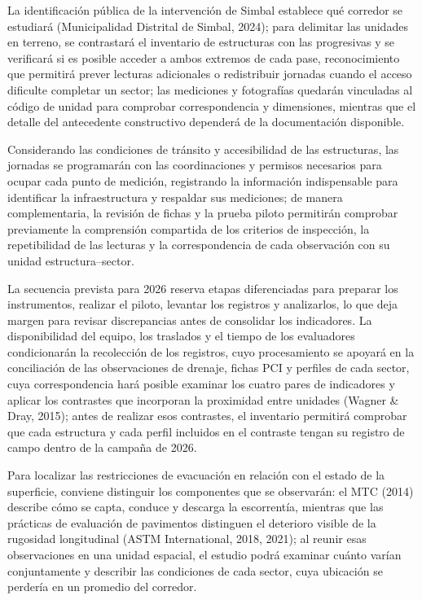 La identificación pública de la intervención de Simbal establece qué corredor se estudiará (Municipalidad Distrital de Simbal, 2024); para delimitar las unidades en terreno, se contrastará el inventario de estructuras con las progresivas y se verificará si es posible acceder a ambos extremos de cada pase, reconocimiento que permitirá prever lecturas adicionales o redistribuir jornadas cuando el acceso dificulte completar un sector; las mediciones y fotografías quedarán vinculadas al código de unidad para comprobar correspondencia y dimensiones, mientras que el detalle del antecedente constructivo dependerá de la documentación disponible.

Considerando las condiciones de tránsito y accesibilidad de las estructuras, las jornadas se programarán con las coordinaciones y permisos necesarios para ocupar cada punto de medición, registrando la información indispensable para identificar la infraestructura y respaldar sus mediciones; de manera complementaria, la revisión de fichas y la prueba piloto permitirán comprobar previamente la comprensión compartida de los criterios de inspección, la repetibilidad de las lecturas y la correspondencia de cada observación con su unidad estructura–sector.

La secuencia prevista para 2026 reserva etapas diferenciadas para preparar los instrumentos, realizar el piloto, levantar los registros y analizarlos, lo que deja margen para revisar discrepancias antes de consolidar los indicadores. La disponibilidad del equipo, los traslados y el tiempo de los evaluadores condicionarán la recolección de los registros, cuyo procesamiento se apoyará en la conciliación de las observaciones de drenaje, fichas PCI y perfiles de cada sector, cuya correspondencia hará posible examinar los cuatro pares de indicadores y aplicar los contrastes que incorporan la proximidad entre unidades (Wagner \& Dray, 2015); antes de realizar esos contrastes, el inventario permitirá comprobar que cada estructura y cada perfil incluidos en el contraste tengan su registro de campo dentro de la campaña de 2026.


Para localizar las restricciones de evacuación en relación con el estado de la superficie, conviene distinguir los componentes que se observarán: el MTC (2014) describe cómo se capta, conduce y descarga la escorrentía, mientras que las prácticas de evaluación de pavimentos distinguen el deterioro visible de la rugosidad longitudinal (ASTM International, 2018, 2021); al reunir esas observaciones en una unidad espacial, el estudio podrá examinar cuánto varían conjuntamente y describir las condiciones de cada sector, cuya ubicación se perdería en un promedio del corredor.

